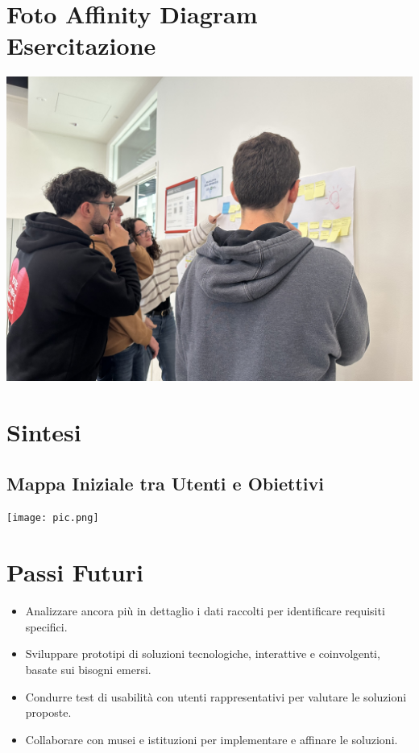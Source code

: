 \documentclass{article}
\begin{document}
\section{Foto Affinity Diagram Esercitazione}

\vspace*{\fill}
\begin{center}
    \includegraphics[width=\textwidth]{affinity_diagram.png} %
\end{center}
\vspace*{\fill}

\section{Sintesi}

\subsection{Mappa Iniziale tra Utenti e Obiettivi}
\vspace*{\fill}
\begin{center}
    \texttt{[image: pic.png]}
\end{center}
\vspace*{\fill}

\section{Passi Futuri}

\begin{itemize}
    \item Analizzare ancora più in dettaglio i dati raccolti per identificare requisiti specifici.
    \item Sviluppare prototipi di soluzioni tecnologiche, interattive e coinvolgenti, basate sui bisogni emersi.
    \item Condurre test di usabilità con utenti rappresentativi per valutare le soluzioni proposte.
    \item Collaborare con musei e istituzioni per implementare e affinare le soluzioni.
\end{itemize}
\end{document}
